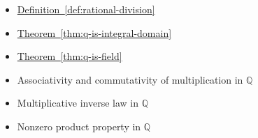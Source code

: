 \begin{dependencies}
\begin{itemize}
  \item \hyperref[def:rational-division]{Definition~\ref*{def:rational-division}}
  \item \hyperref[thm:q-is-integral-domain]{Theorem~\ref*{thm:q-is-integral-domain}}
  \item \hyperref[thm:q-is-field]{Theorem~\ref*{thm:q-is-field}}
  \item Associativity and commutativity of multiplication in $\mathbb{Q}$
  \item Multiplicative inverse law in $\mathbb{Q}$
  \item Nonzero product property in $\mathbb{Q}$
\end{itemize}
\end{dependencies}

\clearpage
